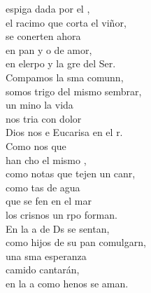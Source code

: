 \documentclass[12pt]{article}
\begin{document}
\begin{multicols*}{2}
\begin{cancion}%
	 espiga dada por el ,\\
	el racimo que corta el viñor,\\
	se conerten ahora\\
	en pan y o de amor,\\
	en elerpo y la gre del Ser.\\
	Compamos la sma comunn,\\
	somos trigo del mismo sembrar,\\
	un mino la vida \\
	nos tria con dolor\\
	Dios nos e Eucarisa en el r.\\
	Como nos que \\
	han cho el mismo ,\\
	como notas que tejen un canr,\\
	como tas de agua \\
	que se fen en el mar\\
	los crisnos un rpo forman.\\
	En la a de Ds se sentan,\\
	como hijos de su pan comulgarn,\\
	una sma esperanza \\
	camido cantarán,\\
	en la a como henos se aman.\\
\end{cancion}%


\end{multicols*}
\end{document}

